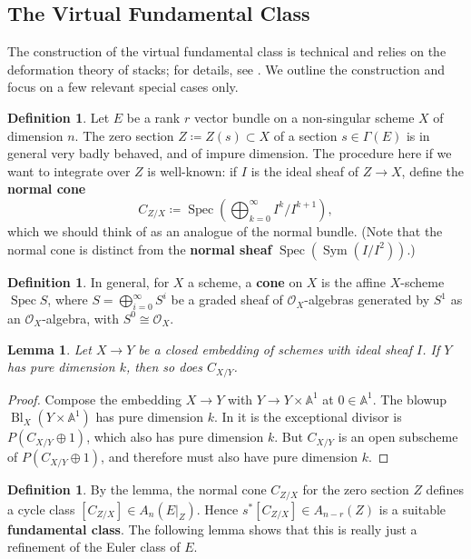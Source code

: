\documentclass{report}
\theoremstyle{plain}
\newtheorem{lemma}[theorem]{Lemma}
\theoremstyle{definition}
\newtheorem{definition}[theorem]{Definition}
\theoremstyle{remark}
\newcommand{\bA}{\mathbb{A}}
\newcommand{\cO}{\mathcal{O}}
\DeclareMathOperator{\Sym}{Sym}
\DeclareMathOperator{\Spec}{Spec}
\DeclareMathOperator{\Bl}{Bl}
\begin{document}
\subsection{The Virtual Fundamental Class}

The construction of the virtual fundamental class is technical and
relies on the deformation theory of stacks; for details, see
\cite{Behrend1997}. We outline the construction and focus on a few
relevant special cases only.

\begin{definition}
  Let $E$ be a rank $r$ vector bundle on a non-singular scheme $X$ of
  dimension $n$. The zero section $Z \coloneqq Z(s) \subset X$ of a
  section $s \in \Gamma(E)$ is in general very badly behaved, and of
  impure dimension. The procedure here if we want to integrate over
  $Z$ is well-known: if $I$ is the ideal sheaf of $Z \to X$, define
  the {\bf normal cone}
  \[ C_{Z/X} \coloneqq \Spec\left(\bigoplus_{k=0}^\infty I^k/I^{k+1}\right), \]
  which we should think of as an analogue of the normal bundle. (Note
  that the normal cone is distinct from the {\bf normal sheaf}
  $\Spec(\Sym(I/I^2))$.)
\end{definition}

\begin{definition}
  In general, for $X$ a scheme, a {\bf cone} on $X$ is the affine
  $X$-scheme $\Spec S$, where $S = \bigoplus_{i=0}^\infty S^i$ be a
  graded sheaf of $\cO_X$-algebras generated by $S^1$ as an
  $\cO_X$-algebra, with $S^0 \cong \cO_X$.
\end{definition}

\begin{lemma} \label{thm:normal-cone-pure-dimension}
  Let $X \to Y$ be a closed embedding of schemes with ideal sheaf $I$.
  If $Y$ has pure dimension $k$, then so does $C_{X/Y}$.
\end{lemma}

\begin{proof}
  Compose the embedding $X \to Y$ with $Y \to Y \times \bA^1$ at $0
  \in \bA^1$. The blowup $\Bl_X(Y \times \bA^1)$ has pure dimension
  $k$. In it is the exceptional divisor is $P(C_{X/Y} \oplus 1)$,
  which also has pure dimension $k$. But $C_{X/Y}$ is an open
  subscheme of $P(C_{X/Y} \oplus 1)$, and therefore must also have
  pure dimension $k$.
\end{proof}

\begin{definition} \label{def:zero-locus-fundamental-class}
  By the lemma, the normal cone $C_{Z/X}$ for the zero section $Z$
  defines a cycle class $[C_{Z/X}] \in A_n(E|_Z)$. Hence $s^*[C_{Z/X}]
  \in A_{n-r}(Z)$ is a suitable {\bf fundamental class}. The following
  lemma shows that this is really just a refinement of the Euler class
  of $E$.
\end{definition}
\end{document}
